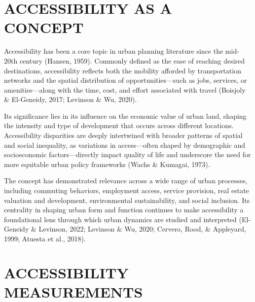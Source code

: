 \documentclass[
  12pt,
]{report}
\begin{document}
\section{ACCESSIBILITY AS A CONCEPT}\label{accessibility-as-a-concept}

Accessibility has been a core topic in urban planning literature since
the mid-20th century (Hansen, 1959). Commonly defined as the ease of
reaching desired destinations, accessibility reflects both the mobility
afforded by transportation networks and the spatial distribution of
opportunities---such as jobs, services, or amenities---along with the
time, cost, and effort associated with travel (Boisjoly \& El-Geneidy,
2017; Levinson \& Wu, 2020).

Its significance lies in its influence on the economic value of urban
land, shaping the intensity and type of development that occurs across
different locations. Accessibility disparities are deeply intertwined
with broader patterns of spatial and social inequality, as variations in
access---often shaped by demographic and socioeconomic
factors---directly impact quality of life and underscore the need for
more equitable urban policy frameworks (Wachs \& Kumagai, 1973).

The concept has demonstrated relevance across a wide range of urban
processes, including commuting behaviors, employment access, service
provision, real estate valuation and development, environmental
sustainability, and social inclusion. Its centrality in shaping urban
form and function continues to make accessibility a foundational lens
through which urban dynamics are studied and interpreted (El-Geneidy \&
Levinson, 2022; Levinson \& Wu, 2020; Cervero, Rood, \& Appleyard, 1999;
Atuesta et al., 2018).

\section{ACCESSIBILITY MEASUREMENTS}\label{accessibility-measurements}
\end{document}
